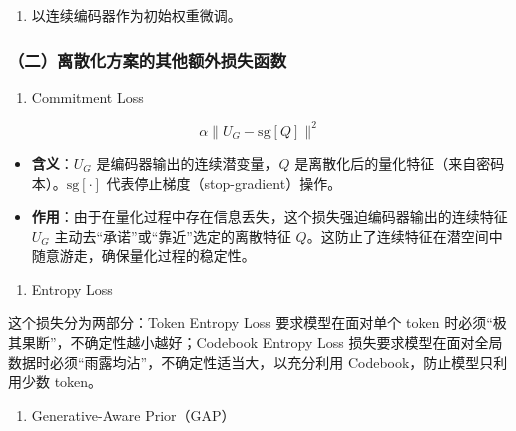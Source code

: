 \begin{enumerate}
\def\labelenumi{\arabic{enumi}.}
\setcounter{enumi}{1}
\tightlist
\item
  以连续编码器作为初始权重微调。
\end{enumerate}

\hypertarget{ux4e8cux79bbux6563ux5316ux65b9ux6848ux7684ux5176ux4ed6ux989dux5916ux635fux5931ux51fdux6570}{%
\subsubsection{（二）离散化方案的其他额外损失函数}\label{ux4e8cux79bbux6563ux5316ux65b9ux6848ux7684ux5176ux4ed6ux989dux5916ux635fux5931ux51fdux6570}}

\begin{enumerate}
\def\labelenumi{\arabic{enumi}.}
\tightlist
\item
  Commitment Loss
\end{enumerate}

\[
\alpha\lVert U_G-\mathrm{sg}[Q]\rVert^2
\]

\begin{itemize}
\tightlist
\item
  \textbf{含义}：\(U_G\) 是编码器输出的连续潜变量，\(Q\) 是离散化后的量化特征（来自密码本）。\(\mathrm{sg}[\cdot]\) 代表停止梯度（stop-gradient）操作。
\item
  \textbf{作用}：由于在量化过程中存在信息丢失，这个损失强迫编码器输出的连续特征 \(U_G\) 主动去``承诺''或``靠近''选定的离散特征 \(Q\)。这防止了连续特征在潜空间中随意游走，确保量化过程的稳定性。
\end{itemize}

\begin{enumerate}
\def\labelenumi{\arabic{enumi}.}
\setcounter{enumi}{1}
\tightlist
\item
  Entropy Loss
\end{enumerate}

这个损失分为两部分：Token Entropy Loss 要求模型在面对单个 token 时必须``极其果断''，不确定性越小越好；Codebook Entropy Loss 损失要求模型在面对全局数据时必须``雨露均沾''，不确定性适当大，以充分利用 Codebook，防止模型只利用少数 token。

\begin{enumerate}
\def\labelenumi{\arabic{enumi}.}
\setcounter{enumi}{2}
\tightlist
\item
  Generative-Aware Prior（GAP）
\end{enumerate}

